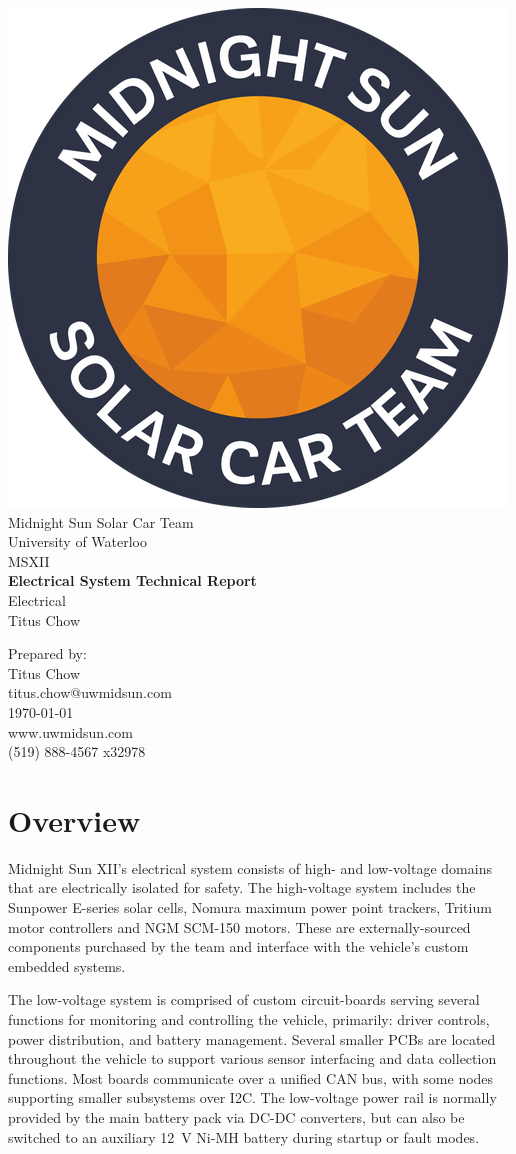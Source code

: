 \documentclass[10pt]{article}
\makeatletter
\newcommand\theteamname{Midnight Sun Solar Car Team} %
\newcommand\theuniversityname{University of Waterloo} %
\newcommand\theteamwebsite{www.uwmidsun.com} %
\newcommand\theteamphone{(519) 888-4567 x32978} %
\newcommand\thetitle{Electrical System Technical Report} %
\newcommand\thesubtitle{Electrical} %
\newcommand\theauthor{Titus Chow} %
\newcommand\theauthorcontact{titus.chow@uwmidsun.com} %
\newcommand\thedate{\today} %
\makeatother
\begin{document}
\begin{titlepage}
\large
\vspace*{2cm}
\centering
\includegraphics[width=.25\textwidth]{./figures/midnightSunLogoCircle.png} \\
\vspace{1.5cm}
{\LARGE \theteamname} \\
\theuniversityname \\
\vspace{2.2cm}
{\LARGE MSXII} \\
\vspace{0.4cm}
{\huge\bfseries \thetitle} \\
\vspace{0.2cm}
{\LARGE \thesubtitle} \\
\vspace{2.2cm}
\ifdefined \theauthor
\par Prepared by: \\
\theauthor \\
\theauthorcontact \\
\fi
\thedate \\
\vfill
\theteamwebsite \\
\theteamphone
\end{titlepage}

\tableofcontents
\listoffigures %

\section{Overview}
Midnight Sun XII's electrical system consists of high- and low-voltage domains that are electrically isolated for safety. The high-voltage system includes the Sunpower E-series solar cells, Nomura maximum power point trackers, Tritium motor controllers and NGM SCM-150 motors. These are externally-sourced components purchased by the team and interface with the vehicle's custom embedded systems.

The low-voltage system is comprised of custom circuit-boards serving several functions for monitoring and controlling the vehicle, primarily: driver controls, power distribution, and battery management. Several smaller PCBs are located throughout the vehicle to support various sensor interfacing and data collection functions. Most boards communicate over a unified CAN bus, with some nodes supporting smaller subsystems over I2C. The low-voltage power rail is normally provided by the main battery pack via DC-DC converters, but can also be switched to an auxiliary \SI{12}{\volt} Ni-MH battery during startup or fault modes.
\end{document}
